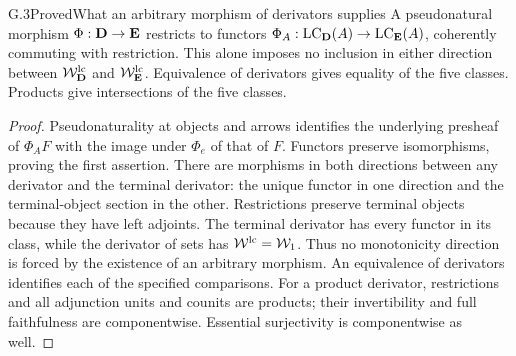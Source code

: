 \begin{claim}{G.3}{Proved}{What an arbitrary morphism of derivators supplies}
A pseudonatural morphism $\Phi:\mathbf D\to\mathbf E$ restricts to
functors $\Phi_A:\operatorname{LC}_\mathbf D(A)\to\operatorname{LC}_{\mathbf E}(A)$, coherently
commuting with restriction. This alone imposes no inclusion in
either direction between $\mathcal W_\mathbf D^{\mathrm{lc}}$ and
$\mathcal W_{\mathbf E}^{\mathrm{lc}}$. Equivalence of derivators gives
equality of the five classes. Products give intersections of the
five classes.
\end{claim}
\begin{proof}
Pseudonaturality at objects and arrows identifies the underlying
presheaf of $\Phi_A F$ with the image under $\Phi_e$ of that of
$F$. Functors preserve isomorphisms, proving the first assertion.
There are morphisms in both directions between any derivator and
the terminal derivator: the unique functor in one direction and
the terminal-object section in the other. Restrictions preserve
terminal objects because they have left adjoints. The terminal
derivator has every functor in its class, while the derivator of
sets has $\mathcal W^{\mathrm{lc}}=\mathcal W_1$. Thus no monotonicity direction
is forced by the existence of an arbitrary morphism. An equivalence
of derivators identifies each of the specified comparisons.
For a product derivator, restrictions and all adjunction units and
counits are products; their invertibility and full faithfulness are
componentwise. Essential surjectivity is componentwise as well.
\end{proof}

